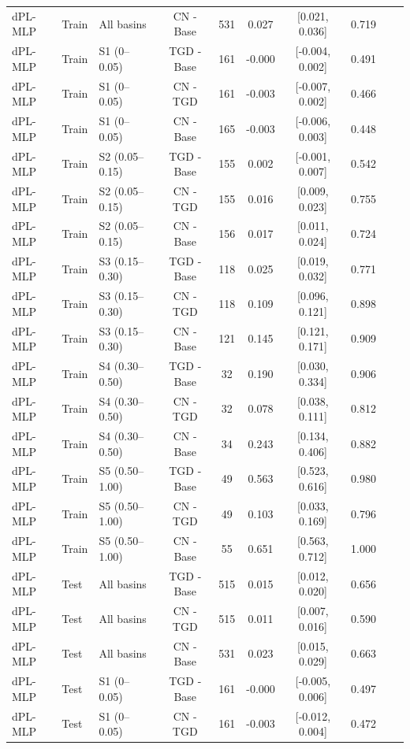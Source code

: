 \begin{table}[t]
\begin{threeparttable}
\begin{tabular}{lllccccccc}
dPL-MLP & Train & All basins & CN - Base & 531 & 0.027 & [0.021, 0.036] & 0.719 \\
dPL-MLP & Train & S1 (0–0.05) & TGD - Base & 161 & -0.000 & [-0.004, 0.002] & 0.491 \\
dPL-MLP & Train & S1 (0–0.05) & CN - TGD & 161 & -0.003 & [-0.007, 0.002] & 0.466 \\
dPL-MLP & Train & S1 (0–0.05) & CN - Base & 165 & -0.003 & [-0.006, 0.003] & 0.448 \\
dPL-MLP & Train & S2 (0.05–0.15) & TGD - Base & 155 & 0.002 & [-0.001, 0.007] & 0.542 \\
dPL-MLP & Train & S2 (0.05–0.15) & CN - TGD & 155 & 0.016 & [0.009, 0.023] & 0.755 \\
dPL-MLP & Train & S2 (0.05–0.15) & CN - Base & 156 & 0.017 & [0.011, 0.024] & 0.724 \\
dPL-MLP & Train & S3 (0.15–0.30) & TGD - Base & 118 & 0.025 & [0.019, 0.032] & 0.771 \\
dPL-MLP & Train & S3 (0.15–0.30) & CN - TGD & 118 & 0.109 & [0.096, 0.121] & 0.898 \\
dPL-MLP & Train & S3 (0.15–0.30) & CN - Base & 121 & 0.145 & [0.121, 0.171] & 0.909 \\
dPL-MLP & Train & S4 (0.30–0.50) & TGD - Base & 32 & 0.190 & [0.030, 0.334] & 0.906 \\
dPL-MLP & Train & S4 (0.30–0.50) & CN - TGD & 32 & 0.078 & [0.038, 0.111] & 0.812 \\
dPL-MLP & Train & S4 (0.30–0.50) & CN - Base & 34 & 0.243 & [0.134, 0.406] & 0.882 \\
dPL-MLP & Train & S5 (0.50–1.00) & TGD - Base & 49 & 0.563 & [0.523, 0.616] & 0.980 \\
dPL-MLP & Train & S5 (0.50–1.00) & CN - TGD & 49 & 0.103 & [0.033, 0.169] & 0.796 \\
dPL-MLP & Train & S5 (0.50–1.00) & CN - Base & 55 & 0.651 & [0.563, 0.712] & 1.000 \\
dPL-MLP & Test & All basins & TGD - Base & 515 & 0.015 & [0.012, 0.020] & 0.656 \\
dPL-MLP & Test & All basins & CN - TGD & 515 & 0.011 & [0.007, 0.016] & 0.590 \\
dPL-MLP & Test & All basins & CN - Base & 531 & 0.023 & [0.015, 0.029] & 0.663 \\
dPL-MLP & Test & S1 (0–0.05) & TGD - Base & 161 & -0.000 & [-0.005, 0.006] & 0.497 \\
dPL-MLP & Test & S1 (0–0.05) & CN - TGD & 161 & -0.003 & [-0.012, 0.004] & 0.472 \\

\end{tabular}
\end{threeparttable}
\end{table}
